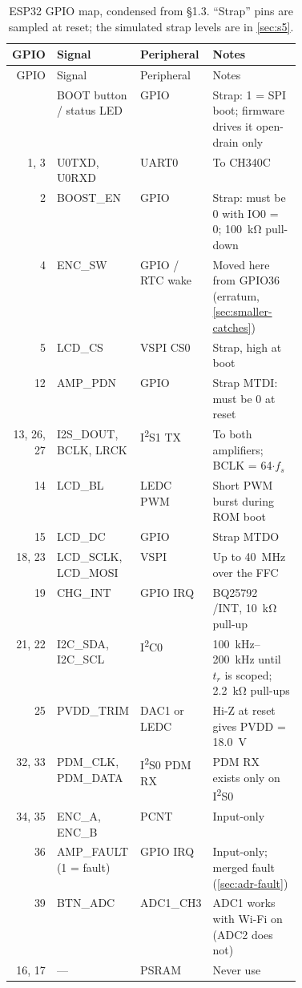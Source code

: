 {\small
\begin{longtable}{@{}r l l >{\raggedright\arraybackslash}p{0.42\linewidth}@{}}
\caption{ESP32 GPIO map, condensed from \protect{} §1.3. ``Strap'' pins are sampled at reset; the simulated strap levels are in \cref{sec:s5}.}\label{tab:gpio}\\
\toprule
GPIO & Signal & Peripheral & Notes \\
\midrule
\endfirsthead
\toprule GPIO & Signal & Peripheral & Notes \\ \midrule
\endhead
\bottomrule
\endfoot
0 & BOOT button / status LED & GPIO & Strap: 1 = SPI boot; firmware drives it open-drain only \\
1, 3 & U0TXD, U0RXD & UART0 & To CH340C \\
2 & BOOST\_EN & GPIO & Strap: must be 0 with IO0 = 0; \qty{100}{\kilo\ohm} pull-down \\
4 & ENC\_SW & GPIO / RTC wake & Moved here from GPIO36 (erratum, \cref{sec:smaller-catches}) \\
5 & LCD\_CS & VSPI CS0 & Strap, high at boot \\
12 & AMP\_PDN & GPIO & Strap MTDI: must be 0 at reset \\
13, 26, 27 & I2S\_DOUT, BCLK, LRCK & I\textsuperscript{2}S1 TX & To both amplifiers; BCLK = 64$\cdot f_s$ \\
14 & LCD\_BL & LEDC PWM & Short PWM burst during ROM boot \\
15 & LCD\_DC & GPIO & Strap MTDO \\
18, 23 & LCD\_SCLK, LCD\_MOSI & VSPI & Up to \qty{40}{\mega\hertz} over the FFC \\
19 & CHG\_INT & GPIO IRQ & BQ25792 /INT, \qty{10}{\kilo\ohm} pull-up \\
21, 22 & I2C\_SDA, I2C\_SCL & I\textsuperscript{2}C0 & \qtyrange{100}{200}{\kilo\hertz} until $t_r$ is scoped; \qty{2.2}{\kilo\ohm} pull-ups \\
25 & PVDD\_TRIM & DAC1 or LEDC & Hi-Z at reset gives PVDD = \qty{18.0}{\volt} \\
32, 33 & PDM\_CLK, PDM\_DATA & I\textsuperscript{2}S0 PDM RX & PDM RX exists only on I\textsuperscript{2}S0 \\
34, 35 & ENC\_A, ENC\_B & PCNT & Input-only \\
36 & AMP\_FAULT (1 = fault) & GPIO IRQ & Input-only; merged fault (\cref{sec:adr-fault}) \\
39 & BTN\_ADC & ADC1\_CH3 & ADC1 works with Wi-Fi on (ADC2 does not) \\
16, 17 & --- & PSRAM & Never use \\
\end{longtable}
}

